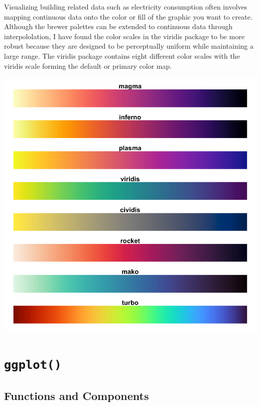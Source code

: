 \documentclass[
]{book}
\begin{document}
Visualizing building related data such as electricity consumption often involves mapping continuous data onto the color or fill of the graphic you want to create. Although the brewer palettes can be extended to continuous data through interpololation, I have found the color scales in the viridis package to be more robust because they are designed to be perceptually uniform while maintaining a large range. The viridis package contains eight different color scales with the viridis scale forming the default or primary color map.

\begin{center}\includegraphics[width=12.61in,height=0.7\textheight]{figures/viridis} \end{center}

\hypertarget{ggplot}{%
\section{\texorpdfstring{\texttt{ggplot()}}{ggplot()}}\label{ggplot}}

\hypertarget{functions-and-components}{%
\subsection{Functions and Components}\label{functions-and-components}}
\end{document}
